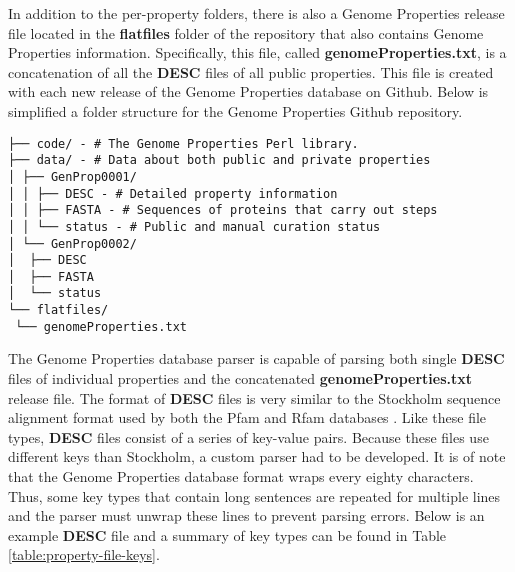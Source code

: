 In addition to the per-property folders, there is also a Genome Properties release file located in the \textbf{flatfiles} folder of the repository that also contains Genome Properties information. Specifically, this file, called \textbf{genomeProperties.txt}, is a concatenation of all the \textbf{DESC} files of all public properties. This file is created with each new release of the Genome Properties database on Github. Below is simplified a folder structure for the Genome Properties Github repository.

\begin{verbatim}
├── code/ - # The Genome Properties Perl library.
├── data/ - # Data about both public and private properties
│ ├── GenProp0001/
│ │ ├── DESC - # Detailed property information
│ │ ├── FASTA - # Sequences of proteins that carry out steps
│ │ └── status - # Public and manual curation status
│ └── GenProp0002/
│  ├── DESC
│  ├── FASTA
│  └── status
└── flatfiles/
 └── genomeProperties.txt
\end{verbatim}

The Genome Properties database parser is capable of parsing both single \textbf{DESC} files of individual properties and the concatenated \textbf{genomeProperties.txt} release file. The format of \textbf{DESC} files is very similar to the Stockholm sequence alignment format used by both the Pfam and Rfam databases \cite{bateman2004pfam, griffiths2003rfam}. Like these file types, \textbf{DESC} files consist of a series of key-value pairs. Because these files use different keys than Stockholm, a custom parser had to be developed. It is of note that the Genome Properties database format wraps every eighty characters. Thus, some key types that contain long sentences are repeated for multiple lines and the parser must unwrap these lines to prevent parsing errors. Below is an example \textbf{DESC} file and a summary of key types can be found in Table \ref{table:property-file-keys}.

